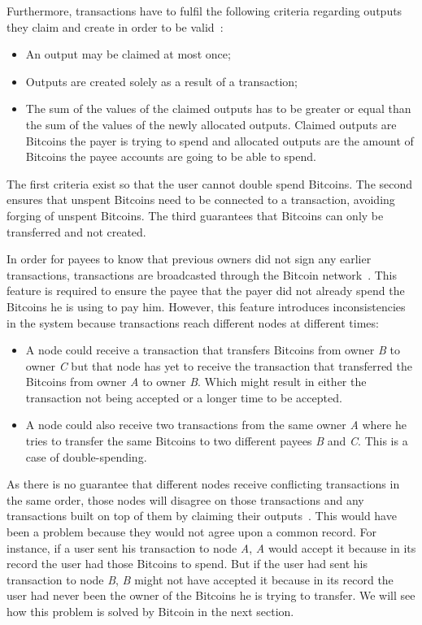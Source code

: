 Furthermore, transactions have to fulfil the following criteria regarding outputs they claim and create in order to be valid~\cite{decker2013information}:
\begin{itemize}
  \item An output may be claimed at most once;
  \item Outputs are created solely as a result of a transaction;
  \item The sum of the values of the claimed outputs has to be greater or equal than the sum of the values of the newly allocated outputs. Claimed outputs are Bitcoins the payer is trying to spend and allocated outputs are the amount of Bitcoins the payee accounts are going to be able to spend.
\end{itemize}

The first criteria exist so that the user cannot double spend Bitcoins. The second ensures that unspent Bitcoins need to be connected to a transaction, avoiding forging of unspent Bitcoins. The third guarantees that Bitcoins can only be transferred and not created.

In order for payees to know that previous owners did not sign any earlier transactions, transactions are broadcasted through the Bitcoin network~\cite{nakamoto2008bitcoin}. This feature is required to ensure the payee that the payer did not already spend the Bitcoins he is using to pay him. However, this feature introduces inconsistencies in the system because transactions reach different nodes at different times:
\begin{itemize}
    \item A node could receive a transaction that transfers Bitcoins from owner \textit{B} to owner \textit{C} but that node has yet to receive the transaction that transferred the Bitcoins from owner \textit{A} to owner \textit{B}. Which might result in either the transaction not being accepted or a longer time to be accepted.
    \item A node could also receive two transactions from the same owner \textit{A} where he tries to transfer the same Bitcoins to two different payees \textit{B} and \textit{C}. This is a case of double-spending.
\end{itemize}

As there is no guarantee that different nodes receive conflicting transactions in the same order, those nodes will disagree on those transactions and any transactions built on top of them by claiming their outputs~\cite{decker2013information}. This would have been a problem because they would not agree upon a common record. For instance, if a user sent his transaction to node \textit{A}, \textit{A} would accept it because in its record the user had those Bitcoins to spend. But if the user had sent his transaction to node \textit{B},  \textit{B} might not have accepted it because in its record the user had never been the owner of the Bitcoins he is trying to transfer. We will see how this problem is solved by Bitcoin in the next section.

